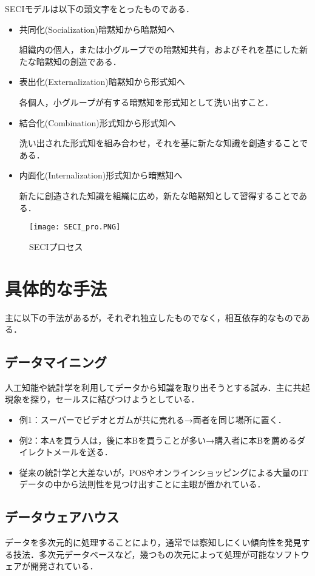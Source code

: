 SECIモデルは以下の頭文字をとったものである．
\begin{itemize}
  \item 共同化(Socialization)暗黙知から暗黙知へ

組織内の個人，または小グループでの暗黙知共有，およびそれを基にした新たな暗黙知の創造である．

  \item 表出化(Externalization)暗黙知から形式知へ

各個人，小グループが有する暗黙知を形式知として洗い出すこと．
  \item 結合化(Combination)形式知から形式知へ

洗い出された形式知を組み合わせ，それを基に新たな知識を創造することである．
  \item 内面化(Internalization)形式知から暗黙知へ

新たに創造された知識を組織に広め，新たな暗黙知として習得することである\cite{management}．

\end{itemize}

\begin{figure}[H]
\centering
\texttt{[image: SECI\_pro.PNG]}
\caption{SECIプロセス}\label{サンプル図}
\end{figure}


\section{具体的な手法}
主に以下の手法があるが，それぞれ独立したものでなく，相互依存的なものである\cite{management}．
\subsection{データマイニング}
人工知能や統計学を利用してデータから知識を取り出そうとする試み．主に共起現象を探り，セールスに結びつけようとしている．

\begin{itemize}
  \item 例1：スーパーでビデオとガムが共に売れる→両者を同じ場所に置く．
  \item 例2：本Aを買う人は，後に本Bを買うことが多い→購入者に本Bを薦めるダイレクトメールを送る．
  \item 従来の統計学と大差ないが，POSやオンラインショッピングによる大量のITデータの中から法則性を見つけ出すことに主眼が置かれている\cite{management}．
\end{itemize}

\subsection{データウェアハウス}
データを多次元的に処理することにより，通常では察知しにくい傾向性を発見する技法．多次元データベースなど，幾つもの次元によって処理が可能なソフトウェアが開発されている．

